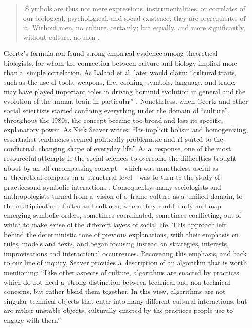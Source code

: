 \begin{quotation}
[S]ymbols are thus not mere expressions, instrumentalities, or correlates of our biological, psychological, and social existence; they are prerequisites of it. Without men, no culture, certainly; but equally, and more significantly, without culture, no men
\parencite*[][p.49]{}.%


\end{quotation}
Geertz's formulation found strong empirical evidence among theoretical biologists, for whom the connection between culture and biology implied more than a~simple correlation. As Laland et al.
\parencite*[][p.131]{laland_niche_2000} %
 later would claim: ``cultural traits, such as the use of tools, weapons, fire, cooking, symbols, language, and trade, may have played important roles in driving hominid evolution in general and the evolution of the human brain in particular'' 
\parencites[see also][]{dunbar_coevolution_1993}[or][]{aiello_expensive-tissue_1995}. %
 Nonetheless, when Geertz and other social scientists started confining everything under the domain of ``culture'', throughout the 1980s, the concept became too broad and lost its specific, explanatory power. As Nick Seaver 
\parencite*[][p.4]{seaver_algorithms_2017} %
 writes: ``Its implicit holism and homogenizing, essentialist tendencies seemed politically problematic and ill suited to the conflictual, changing shape of everyday life.'' As a~response, one of the most resourceful attempts in the social sciences to overcome the difficulties brought about by an all-encompassing concept—which was nonetheless useful as a~theoretical compass on a~structural level—was to turn to the study of practicesand symbolic interactions 
\parencites[][]{bourdieu_outline_1972}[][]{certeau_practice_1984}[][]{blumer_symbolic_1986}. %
 Consequently, many sociologists and anthropologists turned from a~vision of a~frame culture as a~unified domain, to the multiplication of sites and cultures, where they could study and map emerging symbolic orders, sometimes coordinated, sometimes conflicting, out of which to make sense of the different layers of social life. This approach left behind the deterministic tone of previous explanations, with their emphasis on rules, models and texts, and began focusing instead on strategies, interests, improvisations and interactional occurrences. Recovering this emphasis, and back to our line of inquiry, Seaver 
\parencite*[][p.5]{seaver_algorithms_2017} %
 provides a~description of an algorithm that is worth mentioning: ``Like other aspects of culture, algorithms are enacted by practices which do not heed a~strong distinction between technical and non-technical concerns, but rather blend them together. In this view, algorithms are not singular technical objects that enter into many different cultural interactions, but are rather unstable objects, culturally enacted by the practices people use to engage with them.''

